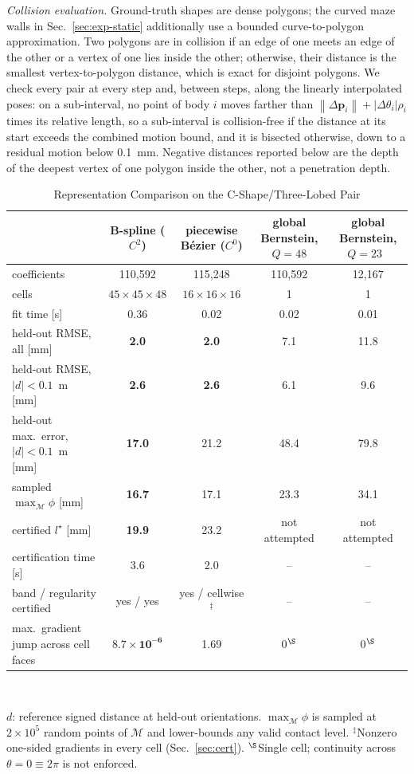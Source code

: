 \documentclass[journal]{IEEEtran}
\theoremstyle{definition}
\newcommand{\norm}[1]{\left\lVert #1\right\rVert}
\newcommand{\Mset}{\mathcal{M}}
\begin{document}
\emph{Collision evaluation.} Ground-truth shapes are dense polygons; the curved maze walls
in Sec.~\ref{sec:exp-static} additionally use a bounded curve-to-polygon approximation. Two
polygons are in collision if an edge of one meets an edge of the other or a vertex of one lies
inside the other; otherwise, their distance is the smallest vertex-to-polygon distance, which is
exact for disjoint polygons. We check every pair at every step and, between steps, along the
linearly interpolated poses: on a sub-interval, no point of body $i$ moves farther than
$\norm{\Delta\mathbf p_i}+|\Delta\theta_i|\rho_i$ times its relative length, so a sub-interval is
collision-free if the distance at its start exceeds the combined motion bound, and it is bisected
otherwise, down to a residual motion below 0.1~mm. Negative distances reported below are the depth
of the deepest vertex of one polygon inside the other, not a penetration depth.

\begin{table}[t]
\caption{Representation Comparison on the C-Shape/Three-Lobed Pair}
\label{tab:repr}
\centering
\footnotesize
\setlength{\tabcolsep}{6pt}
\renewcommand{\arraystretch}{1.1}
\begin{tabular}{lcccc}
\toprule
& B-spline ($C^2$) & piecewise B\'ezier ($C^0$) & global Bernstein, $Q=48$ & global Bernstein, $Q=23$~\cite{jo2026geometry}\\
\midrule
coefficients & 110{,}592 & 115{,}248 & 110{,}592 & 12{,}167\\
cells & $45\times45\times48$ & $16\times16\times16$ & 1 & 1\\
fit time [s] & 0.36 & 0.02 & 0.02 & 0.01\\
held-out RMSE, all [mm] & \textbf{2.0} & \textbf{2.0} & 7.1 & 11.8\\
held-out RMSE, $|d|<0.1$~m [mm] & \textbf{2.6} & \textbf{2.6} & 6.1 & 9.6\\
held-out max.\ error, $|d|<0.1$~m [mm] & \textbf{17.0} & 21.2 & 48.4 & 79.8\\
sampled $\max_{\Mset}\phi$ [mm] & \textbf{16.7} & 17.1 & 23.3 & 34.1\\
certified $l^\star$ [mm] & \textbf{19.9} & 23.2 & not attempted & not attempted\\
certification time [s] & 3.6 & 2.0 & -- & --\\
band / regularity certified & yes / yes & yes / cellwise$^\ddagger$ & -- & --\\
max.\ gradient jump across cell faces & $\mathbf{8.7\times10^{-6}}$ & 1.69 & 0$^\S$ & 0$^\S$\\
\bottomrule
\end{tabular}
\\[3pt]
\parbox{\textwidth}{\footnotesize $d$: reference signed distance at held-out orientations.
$\max_{\Mset}\phi$ is sampled at $2\times10^5$ random points of $\Mset$ and lower-bounds any valid
contact level. $^\ddagger$Nonzero one-sided gradients in every cell (Sec.~\ref{sec:cert}).
$^\S$Single cell; continuity across $\theta=0\equiv2\pi$ is not enforced.}
\end{table}
\end{document}
